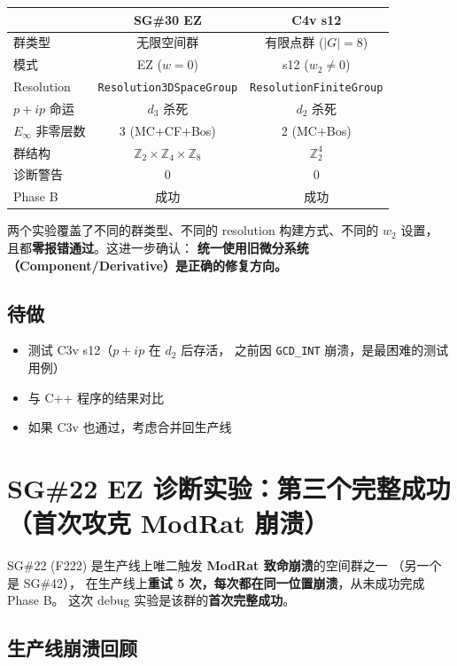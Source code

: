 \documentclass[a4paper,fontset=ubuntu,12pt]{ctexart}
\begin{document}
\begin{center}
\begin{tabular}{l|cc}
\hline
& SG\#30 EZ & C4v s12 \\
\hline
群类型 & 无限空间群 & 有限点群 ($|G|=8$) \\
模式 & EZ ($w=0$) & s12 ($w_2 \neq 0$) \\
Resolution & \texttt{Resolution3DSpaceGroup} & \texttt{ResolutionFiniteGroup} \\
$p{+}ip$ 命运 & $d_3$ 杀死 & $d_2$ 杀死 \\
$E_\infty$ 非零层数 & 3 (MC+CF+Bos) & 2 (MC+Bos) \\
群结构 & $\mathbb{Z}_2 \times \mathbb{Z}_4 \times \mathbb{Z}_8$ & $\mathbb{Z}_2^4$ \\
诊断警告 & 0 & 0 \\
Phase B & 成功 & 成功 \\
\hline
\end{tabular}
\end{center}

两个实验覆盖了不同的群类型、不同的 resolution 构建方式、不同的 $w_2$ 设置，
且都\textbf{零报错通过}。这进一步确认：
\textbf{统一使用旧微分系统（Component/Derivative）是正确的修复方向。}

\subsection{待做}

\begin{itemize}
\item 测试 C3v s12（$p{+}ip$ 在 $d_2$ 后存活，
      之前因 \texttt{GCD\_INT} 崩溃，是最困难的测试用例）
\item 与 C++ 程序的结果对比
\item 如果 C3v 也通过，考虑合并回生产线
\end{itemize}

\section{SG\#22 EZ 诊断实验：第三个完整成功（首次攻克 ModRat 崩溃）}
\label{sec:sg22-ez-success}

SG\#22 (F222) 是生产线上唯二触发 \textbf{ModRat 致命崩溃}的空间群之一
（另一个是 SG\#42），
在生产线上\textbf{重试 5 次，每次都在同一位置崩溃}，从未成功完成 Phase B。
这次 debug 实验是该群的\textbf{首次完整成功}。

\subsection{生产线崩溃回顾}
\end{document}
